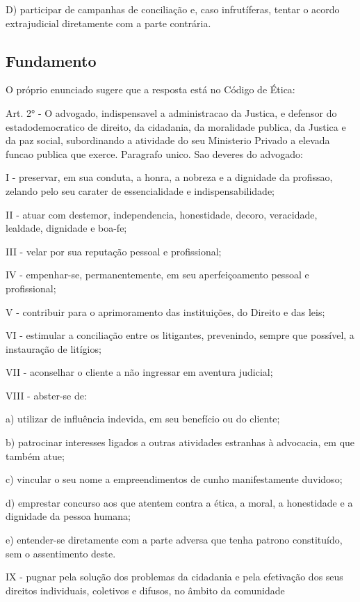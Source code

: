 \documentclass[12pt]{article}
\begin{document}
D) participar de campanhas de conciliação e, caso infrutíferas, 
tentar o acordo extrajudicial diretamente com a parte 
contrária.

\subsection{Fundamento}

O próprio enunciado sugere que a resposta está no Código de Ética:

Art. 2° - O advogado, indispensavel a administracao da Justica, e defensor do estadodemocratico de direito, da cidadania, da moralidade publica, da Justica e da paz social, subordinando a atividade do seu Ministerio Privado a elevada funcao publica que exerce. Paragrafo unico. Sao deveres do advogado:

I - preservar, em sua conduta, a honra, a nobreza e a dignidade da profissao, zelando pelo seu carater de essencialidade e indispensabilidade;

II - atuar com destemor, independencia, honestidade, decoro, veracidade, lealdade, dignidade e boa-fe;

III - velar por sua reputação pessoal e profissional;

IV - empenhar-se, permanentemente, em seu aperfeiçoamento pessoal e profissional;

V - contribuir para o aprimoramento das instituições, do Direito e das leis;

VI - estimular a conciliação entre os litigantes, prevenindo, sempre que possível, a instauração de litígios;

VII - aconselhar o cliente a não ingressar em aventura judicial;

VIII - abster-se de:

a) utilizar de influência indevida, em seu benefício ou do cliente;

b) patrocinar interesses ligados a outras atividades estranhas à advocacia, em que também atue;

c) vincular o seu nome a empreendimentos de cunho manifestamente duvidoso;

d) emprestar concurso aos que atentem contra a ética, a moral, a honestidade e a dignidade da pessoa humana;

e) entender-se diretamente com a parte adversa que tenha patrono constituído, sem o assentimento deste.

IX - pugnar pela solução dos problemas da cidadania e pela efetivação dos seus direitos individuais, coletivos e difusos, no âmbito da comunidade
\end{document}
